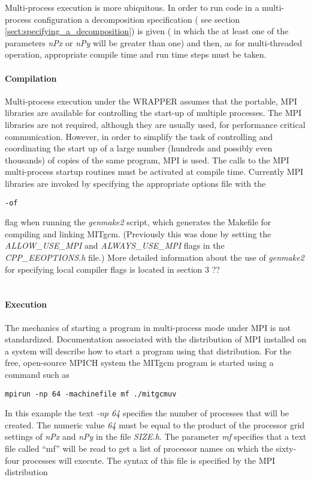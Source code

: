 Multi-process execution is more ubiquitous.
In order to run code in a multi-process configuration a decomposition
specification ( see section \ref{sect:specifying_a_decomposition})
is given ( in which the at least one of the
parameters {\em nPx} or {\em nPy} will be greater than one)
and then, as for multi-threaded operation,
appropriate compile time and run time steps must be taken.

\paragraph{Compilation} Multi-process execution under the WRAPPER 
assumes that the portable, MPI libraries are available
for controlling the start-up of multiple processes. The MPI libraries
are not required, although they are usually used, for performance
critical communication. However, in order to simplify the task
of controlling and coordinating the start up of a large number
(hundreds and possibly even thousands) of copies of the same 
program, MPI is used. The calls to the MPI multi-process startup
routines must be activated at compile time.  Currently MPI libraries are 
invoked by
specifying the appropriate options file with the 
\begin{verbatim}-of\end{verbatim} flag when running the {\em genmake2} 
script, which generates the Makefile for compiling and linking MITgcm.
(Previously this was done by setting the {\em ALLOW\_USE\_MPI} and 
{\em ALWAYS\_USE\_MPI} flags in the {\em CPP\_EEOPTIONS.h} file.)  More
detailed information about the use of {\em genmake2} for specifying 
local compiler flags is located in section 3 ??\\  


 \\
\paragraph{\bf Execution} The mechanics of starting a program in 
multi-process mode under MPI is not standardized. Documentation 
associated with the distribution of MPI installed on a system will
describe how to start a program using that distribution.
For the free, open-source MPICH system the MITgcm program is started
using a command such as
\begin{verbatim}
mpirun -np 64 -machinefile mf ./mitgcmuv
\end{verbatim}
In this example the text {\em -np 64} specifies the number of processes 
that will be created. The numeric value {\em 64} must be equal to the
product of the processor grid settings of {\em nPx} and {\em nPy}
in the file {\em SIZE.h}. The parameter {\em mf} specifies that a text file
called ``mf'' will be read to get a list of processor names on
which the sixty-four processes will execute. The syntax of this file
is specified by the MPI distribution
\\ 

